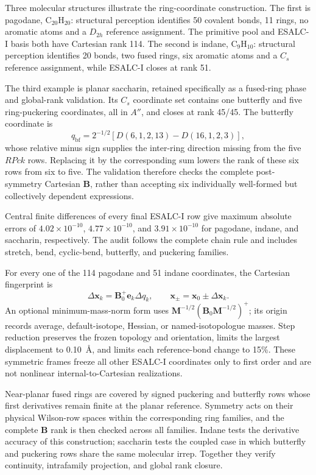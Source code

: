 \documentclass[10pt]{article}
\newcommand{\Bmat}{\mathbf{B}}
\begin{document}
{Three molecular structures illustrate the ring-coordinate construction.  The
first is pagodane, \(\mathrm{C}_{20}\mathrm{H}_{20}\): structural perception identifies 50 covalent bonds, 11 rings, no aromatic atoms and a
\(D_{2h}\) reference assignment.  The primitive pool and ESALC-I basis both have Cartesian rank 114.  The second is indane,
\(\mathrm{C}_{9}\mathrm{H}_{10}\): structural perception identifies 20 bonds, two fused
rings, six aromatic atoms and a \(C_s\) reference assignment, while ESALC-I closes
at rank 51.

The third example is planar saccharin, retained specifically as a fused-ring
phase and global-rank validation.  Its \(C_s\) coordinate set contains one butterfly
and five ring-puckering coordinates, all in \(A''\), and closes at rank 45/45.
The butterfly coordinate is
\begin{equation}
 q_{\mathrm{bf}}=2^{-1/2}\!\left[D(6,1,2,13)-D(16,1,2,3)\right],
\end{equation}
whose relative minus sign supplies the inter-ring direction missing from the
five \(RPck\) rows.  Replacing it by the corresponding sum lowers the rank of
these six rows from six to five.  The validation therefore checks the complete
post-symmetry Cartesian \(\Bmat\), rather than accepting six individually
well-formed but collectively dependent expressions.

Central finite differences of every final ESALC-I row give maximum absolute
errors of \(4.02\times10^{-10}\), \(4.77\times10^{-10}\), and
\(3.91\times10^{-10}\) for pagodane, indane, and saccharin, respectively.  The
audit follows the complete chain rule and includes stretch, bend, cyclic-bend,
butterfly, and puckering families.

For every one of the 114 pagodane and 51 indane coordinates, the Cartesian
fingerprint is
\[
 \Delta\mathbf{x}_k=\mathbf{B}_0^+\mathbf{e}_k\Delta q_k,
 \qquad \mathbf{x}_{\pm}=\mathbf{x}_0\pm\Delta\mathbf{x}_k .
\]
An optional minimum-mass-norm form uses
\(\mathbf{M}^{-1/2}(\mathbf{B}_0\mathbf{M}^{-1/2})^+\); its origin records
average, default-isotope, Hessian, or named-isotopologue masses.  Step reduction
preserves the frozen topology and orientation, limits the largest displacement
to 0.10~\AA, and limits each reference-bond change to 15\%.  These symmetric
frames freeze all other ESALC-I coordinates only to first order and are not nonlinear
internal-to-Cartesian realizations.

Near-planar fused rings are covered by signed puckering and butterfly rows whose
first derivatives remain finite at the planar reference.  Symmetry acts on
their physical Wilson-row spaces within the corresponding ring families, and
the complete \(\Bmat\) rank is then checked across all families.  Indane tests
the derivative accuracy of this construction; saccharin tests the coupled case
in which butterfly and puckering rows share the same molecular irrep.  Together
they verify continuity, intrafamily projection, and global rank closure.

}
\end{document}
